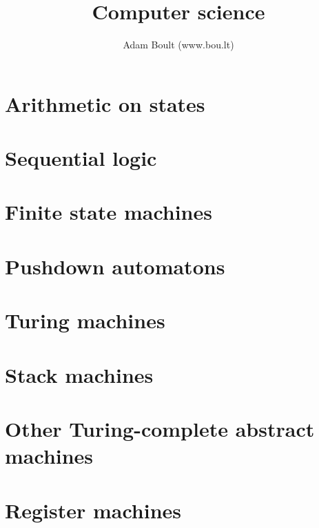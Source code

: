 \documentclass[oneside]{book}
\begin{document}
\author{Adam Boult (www.bou.lt)}
\title{Computer science}
\maketitle

\setcounter{tocdepth}{0}
\tableofcontents



\part{Arithmetic on states}






\part{Sequential logic}



\part{Finite state machines}



\part{Pushdown automatons}




\part{Turing machines}







\part{Stack machines}


\part{Other Turing-complete abstract machines}


\part{Register machines}






\end{document}
